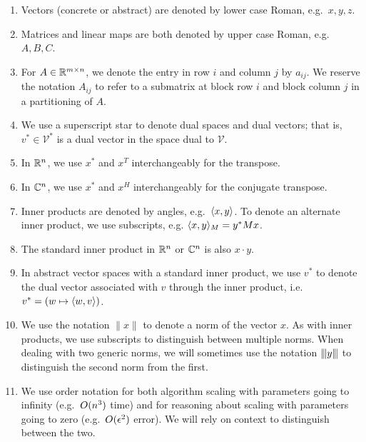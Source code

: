 \documentclass[12pt, leqno]{article}
\begin{document}
\begin{enumerate}
\item
  Vectors (concrete or abstract) are denoted by lower case Roman,
  e.g.~$x, y, z$.

\item
  Matrices and linear maps are both denoted by upper case Roman,
  e.g.~$A, B, C$.

\item
  For $A \in \mathbb{R}^{m \times n}$, we denote the entry in row $i$ and
  column $j$ by $a_{ij}$.  We reserve the notation $A_{ij}$ to refer to
  a submatrix at block row $i$ and block column $j$ in a partitioning of
  $A$.

\item
  We use a superscript star to denote dual spaces and dual vectors; that
  is, $v^* \in \mathcal{V}^*$ is a dual vector in the space dual to
  $\mathcal{V}$.

\item
  In $\mathbb{R}^n$, we use $x^*$ and $x^T$ interchangeably for the transpose.

\item
  In $\mathbb{C}^n$, we use $x^*$ and $x^H$ interchangeably for the conjugate
  transpose.

\item
  Inner products are denoted by angles, e.g.~$\langle x, y \rangle$. To denote an
  alternate inner product, we use subscripts, e.g. $\langle x, y \rangle_M = y^* M
  x$.

\item
  The standard inner product in $\mathbb{R}^n$ or $\mathbb{C}^n$ is also $x \cdot y$.

\item
  In abstract vector spaces with a standard inner product, we use $v^*$
  to denote the dual vector associated with $v$ through the inner
  product, i.e.~$v^* = (w \mapsto \langle w, v \rangle)$.

\item
  We use the notation $\|x\|$ to denote a norm of the vector $x$. As
  with inner products, we use subscripts to distinguish between multiple
  norms.  When dealing with two generic norms, we will sometimes use the
  notation ${\left\vert\kern-0.25ex\left\vert\kern-0.25ex\left\vert y \right\vert\kern-0.25ex\right\vert\kern-0.25ex\right\vert}$ to distinguish the second norm from the first.

\item
  We use order notation for both algorithm scaling with parameters going
  to infinity (e.g.~$O( n^3 )$ time) and for reasoning about scaling
  with parameters going to zero (e.g.~$O( \epsilon^2 )$ error). We
  will rely on context to distinguish between the two.


\end{enumerate}
\end{document}
